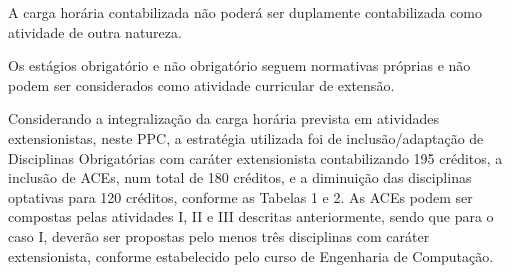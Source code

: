 \bigskip

A carga horária contabilizada não poderá ser duplamente contabilizada como atividade de outra natureza.


\bigskip

Os estágios obrigatório e não obrigatório seguem normativas próprias e não podem ser considerados como atividade
curricular de extensão.


\bigskip



Considerando a integralização da carga horária prevista em atividades extensionistas, neste PPC, a estratégia utilizada foi de inclusão/adaptação de Disciplinas Obrigatórias com caráter extensionista contabilizando
195 créditos, a inclusão de ACEs, num total de 180 créditos, e a diminuição das disciplinas optativas para 120 créditos, conforme as Tabelas 1 e 2. As ACEs podem ser compostas pelas atividades I, II e III descritas anteriormente, sendo que para o caso I, deverão ser propostas pelo menos três disciplinas com caráter extensionista, conforme estabelecido pelo curso de Engenharia de Computação.


\bigskip


